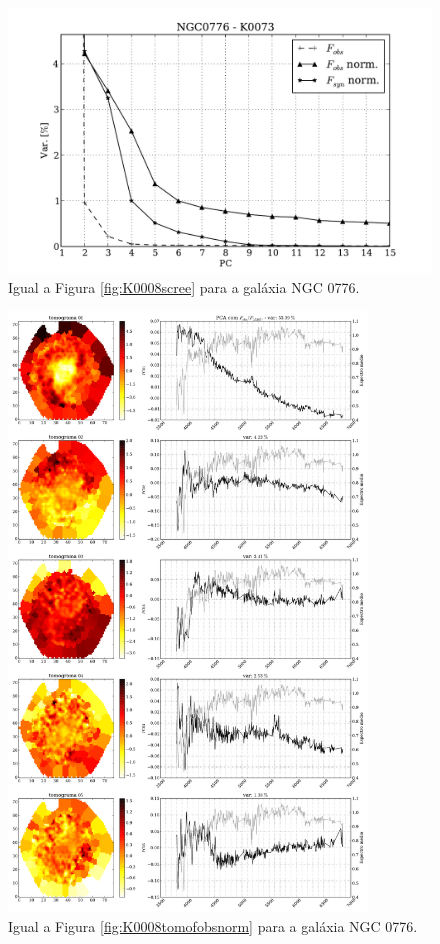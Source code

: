 \begin{figure}
    \includegraphics[height=0.33\textheight]{figuras/K0073-screetest.pdf}
    \caption[Scree test comparativo entre 3 PCAs - NGC 0776.]
    {Igual a Figura \ref{fig:K0008scree} para a galáxia NGC 0776.}
    \label{fig:K0073scree}
\end{figure}

\begin{figure}
    \includegraphics[width=0.85\textwidth]{figuras/K0073-tomo-obs-norm.pdf}
    \caption[Tomogramas de 1 a 5 para o cubo $F_{obs}$ norm. - NGC 0776.]
    {Igual a Figura \ref{fig:K0008tomofobsnorm} para a galáxia NGC 0776.}
    \label{fig:K0073tomofobsnorm}
\end{figure}

